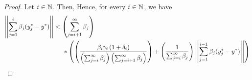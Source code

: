 \begin{lem}
\begin{proof}
        Let $i \in \mathbb{N}$. Then, 
        Hence, for every $i \in \mathbb{N}$, we have 
        \begin{equation}
            \begin{split}
                \norm{\sum_{j=1}^i \beta_j (y_j^*-y^*)} & < \pa{\sum_{j=i+1}^\infty \beta_j} \\
                & \tab[.5cm]*\pa{ \pa{ \frac{\beta_i\gamma_i\pa{1+\delta_i}}{\pa{\sum_{j=i}^\infty \beta_j}\pa{ \sum_{j=i+1}^\infty \beta_j}}} + \pa{\frac{1}{\sum_{j=i}^\infty \beta_j}} \norm{\sum_{j=1}^{i-1} \beta_j (y_j^*-y^*)}}\\

\end{split}
\end{equation}
\end{proof}
\end{lem}
